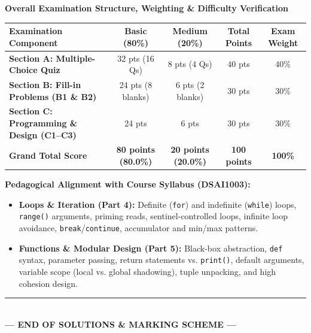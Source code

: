 \documentclass[11pt,a4paper]{article}
\begin{document}
\vspace{2mm}
\begin{tcolorbox}[colback=primaryblue!6, colframe=primaryblue, arc=1.5mm, boxrule=0.8pt, left=3.0mm, right=3.0mm, top=1.8mm, bottom=1.8mm]
\small
\textbf{\large Overall Examination Structure, Weighting \& Difficulty Verification}\\[1.5mm]
\renewcommand{\arraystretch}{1.15}
\begin{tabularx}{\linewidth}{|X|c|c|c||c|}
\hline
\textbf{Examination Component} & \textbf{Basic (80\%)} & \textbf{Medium (20\%)} & \textbf{Total Points} & \textbf{Exam Weight} \\
\hline
\textbf{Section A: Multiple-Choice Quiz} & 32 pts (16 Qs) & 8 pts (4 Qs) & 40 pts & 40\% \\
\hline
\textbf{Section B: Fill-in Problems (B1 \& B2)} & 24 pts (8 blanks) & 6 pts (2 blanks) & 30 pts & 30\% \\
\hline
\textbf{Section C: Programming \& Design (C1--C3)} & 24 pts & 6 pts & 30 pts & 30\% \\
\hline
\hline
\textbf{Grand Total Score} & \textbf{80 points (80.0\%)} & \textbf{20 points (20.0\%)} & \textbf{100 points} & \textbf{100\%} \\
\hline
\end{tabularx}

\vspace{1.5mm}
\textbf{Pedagogical Alignment with Course Syllabus (DSAI1003):}
\begin{itemize}[itemsep=0.2pt,topsep=0.2pt]
  \item \textbf{Loops \& Iteration (Part 4):} Definite (\texttt{for}) and indefinite (\texttt{while}) loops, \texttt{range()} arguments, priming reads, sentinel-controlled loops, infinite loop avoidance, \texttt{break}/\texttt{continue}, accumulator and min/max patterns.
  \item \textbf{Functions \& Modular Design (Part 5):} Black-box abstraction, \texttt{def} syntax, parameter passing, return statements vs. \texttt{print()}, default arguments, variable scope (local vs. global shadowing), tuple unpacking, and high cohesion design.
\end{itemize}
\end{tcolorbox}

\vfill
\begin{center}
  \rule{0.5\textwidth}{0.4pt}\\[0.8mm]
  \textbf{\color{primaryblue}--- END OF SOLUTIONS \& MARKING SCHEME ---}
\end{center}
\end{document}
